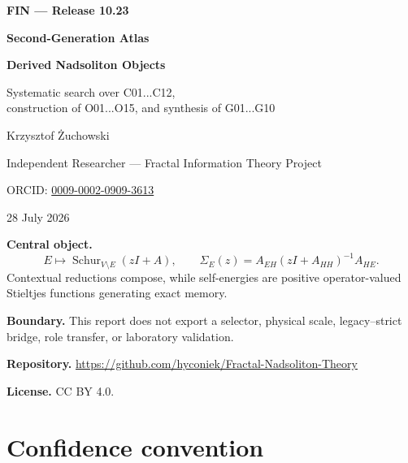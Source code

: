 \documentclass[11pt,a4paper,openany]{report}
\begin{document}
\hypersetup{pageanchor=false}
\begin{titlepage}
\centering
\vspace*{12mm}
{\Large\bfseries FIN --- Release 10.23\par}
\vspace{12mm}
{\Huge\bfseries Second-Generation Atlas\par}
\vspace{5mm}
{\LARGE\bfseries Derived Nadsoliton Objects\par}
\vspace{8mm}
{\Large Systematic search over C01...C12,\\
construction of O01...O15, and synthesis of G01...G10\par}
\vspace{18mm}
{\Large Krzysztof \.Zuchowski\par}
\vspace{2mm}
{\normalsize Independent Researcher --- Fractal Information Theory Project\par}
\vspace{2mm}
{\normalsize ORCID: \href{https://orcid.org/0009-0002-0909-3613}{0009-0002-0909-3613}\par}
\vspace{10mm}
{\large 28 July 2026\par}
\vfill
\begin{minipage}{0.9\textwidth}
\small
\textbf{Central object.}
\[
E\longmapsto \operatorname{Schur}_{V\setminus E}(zI+A),\qquad
\Sigma_E(z)=A_{EH}(zI+A_{HH})^{-1}A_{HE}.
\]
Contextual reductions compose, while self-energies are positive
operator-valued Stieltjes functions generating exact memory.

\medskip
\textbf{Boundary.} This report does not export a selector, physical scale,
legacy--strict bridge, role transfer, or laboratory validation.

\medskip
\textbf{Repository.}
\url{https://github.com/hyconiek/Fractal-Nadsoliton-Theory}

\textbf{License.} CC BY 4.0.
\end{minipage}
\vfill
\end{titlepage}
\hypersetup{pageanchor=true}
\tableofcontents
\clearpage
{}

\chapter*{Confidence convention}
\end{document}
